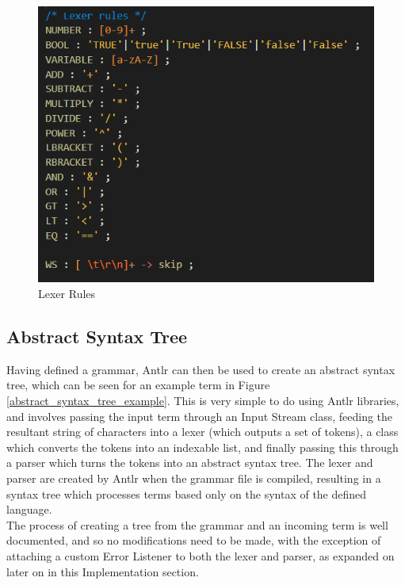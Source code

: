 \documentclass[a4paper,12pt]{report}
\begin{document}
\begin{figure}[p]
\centering
\includegraphics[scale=0.75]{images/lexer_rules}
\caption{Lexer Rules}
\label{lexer_rules}
\end{figure}

\subsection{Abstract Syntax Tree}

Having defined a grammar, Antlr can then be used to create an abstract syntax tree, which can be seen for an example term in Figure \ref{abstract_syntax_tree_example}. This is very simple to do using Antlr libraries, and involves passing the input term through an Input Stream class, feeding the resultant string of characters into a lexer (which outputs a set of tokens), a class which converts the tokens into an indexable list, and finally passing this through a parser which turns the tokens into an abstract syntax tree\cite{Tomassetti2007}. The lexer and parser are created by Antlr when the grammar file is compiled, resulting in a syntax tree which processes terms based only on the syntax of the defined language.\\

The process of creating a tree from the grammar and an incoming term is well documented, and so no modifications need to be made, with the exception of attaching a custom Error Listener to both the lexer and parser, as expanded on later on in this Implementation section.
\end{document}
